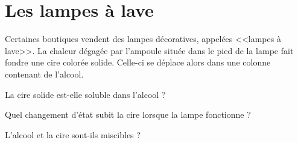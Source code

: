 \section{Les lampes à lave}

Certaines boutiques vendent des lampes décoratives, appelées <<lampes à lave>>. La chaleur dégagée par l'ampoule située dans le pied de la lampe fait fondre une cire colorée solide. Celle-ci se déplace alors dans une colonne contenant de l'alcool.

\begin{questions}
	\question La cire solide est-elle soluble dans l'alcool ?
	
	\question Quel changement d'état subit la cire lorsque la lampe fonctionne ?
	
	\question L'alcool et la cire sont-ils miscibles ?
\end{questions}